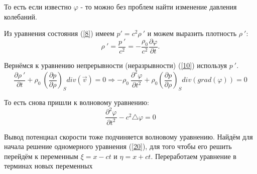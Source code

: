 \documentclass[14pt,a4paper,oneside]{extarticle}	%
\begin{document}
То есть если известно $ \varphi $ - то можно без проблем найти изменение давления колебаний.

Из уравнения состояния (\ref{8}) имеем $ p' = c^{2}  \rho\:' $  и можем выразить плотность $ \rho\:' $:
\begin{equation}\label{18}
\rho\:' = \frac{p\:'}{c^{2}} = - \frac{\rho_{0}}{c^{2}}\frac{\partial \varphi}{\partial t}.
\end{equation}

Вернёмся к уравнению непрерывности (неразрывности) (\ref{10}) используя $ p\:' $.
\begin{equation}\label{19}
\frac{\partial \rho\:'}{\partial t} + \rho_{0}\:\left( \frac{\partial p}{\partial \rho} \right)_{S} div(\vec{v}) = 0 \Rightarrow - \rho_{0}\:\frac{\partial^{2} \varphi}{\partial t^{2}} + \rho_{0}\left( \frac{\partial p}{\partial \rho} \right)_{S} div(grad(\varphi)) = 0
\end{equation}

То есть снова пришли к волновому уравнению:
\begin{equation}\label{20}
\frac{\partial^{2} \varphi}{\partial t^{2}} - c^{2} \triangle \varphi = 0
\end{equation}

Вывод потенциал скорости тоже подчиняется волновому уравнению.
Найдём для начала решение одномерного уравнения (\ref{20}), для того чтобы его решить перейдём к переменным $ \xi = x - ct $ и $ \eta = x + ct $. Переработаем уравнение в терминах новых переменных 
\end{document}
